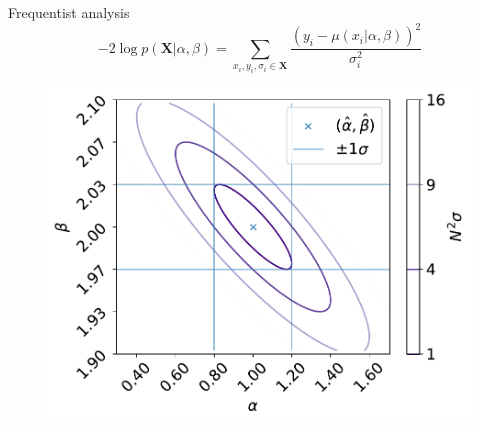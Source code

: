 \documentclass[
aspectratio=169,
14pt,
professionalfonts
]{beamer}
\begin{document}
\begin{frame}{Frequentist analysis}
\vspace{-1cm}
    $$ -2\log p(\boldsymbol{X}|\alpha, \beta) = \sum_{x_i, y_i,\sigma_i \in \boldsymbol{X}}\frac{\left(y_i -\mu(x_i|\alpha, \beta)\right)^2}{\sigma_i^2}$$
    \begin{figure}
        \centering
        \includegraphics[width=0.49\linewidth]{../plots/nll_unconstr.pdf}
    \end{figure}
\end{frame}
\end{document}
